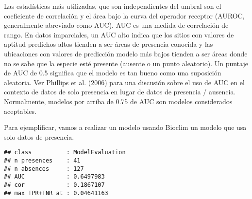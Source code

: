 \documentclass[]{article}
\newenvironment{Shaded}{\begin{snugshade}}{\end{snugshade}}
\newcommand{\KeywordTok}[1]{\textcolor[rgb]{0.13,0.29,0.53}{\textbf{{#1}}}}
\newcommand{\DecValTok}[1]{\textcolor[rgb]{0.00,0.00,0.81}{{#1}}}
\newcommand{\FloatTok}[1]{\textcolor[rgb]{0.00,0.00,0.81}{{#1}}}
\newcommand{\StringTok}[1]{\textcolor[rgb]{0.31,0.60,0.02}{{#1}}}
\newcommand{\CommentTok}[1]{\textcolor[rgb]{0.56,0.35,0.01}{\textit{{#1}}}}
\newcommand{\NormalTok}[1]{{#1}}
\begin{document}
Las estadísticas más utilizadas, que son independientes del umbral son
el coeficiente de correlación y el área bajo la curva del operador
receptor (AUROC, generalmente abreviado como AUC). AUC es una medida de
correlación de rango. En datos imparciales, un AUC alto indica que los
sitios con valores de aptitud predichos altos tienden a ser áreas de
presencia conocida y las ubicaciones con valores de predicción modelo
más bajos tienden a ser áreas donde no se sabe que la especie esté
presente (ausente o un punto aleatorio). Un puntaje de AUC de 0.5
significa que el modelo es tan bueno como una suposición aleatoria. Ver
Phillips et al. (2006) para una discusión sobre el uso de AUC en el
contexto de datos de solo presencia en lugar de datos de presencia /
ausencia. Normalmente, modelos por arriba de 0.75 de AUC son modelos
considerados aceptables.

Para ejemplificar, vamos a realizar un modelo usando Bioclim un modelo
que usa solo datos de presencia.

\begin{Shaded}
\end{Shaded}

\begin{verbatim}
## class          : ModelEvaluation 
## n presences    : 41 
## n absences     : 127 
## AUC            : 0.6497983 
## cor            : 0.1867107 
## max TPR+TNR at : 0.04641163
\end{verbatim}
\end{document}
